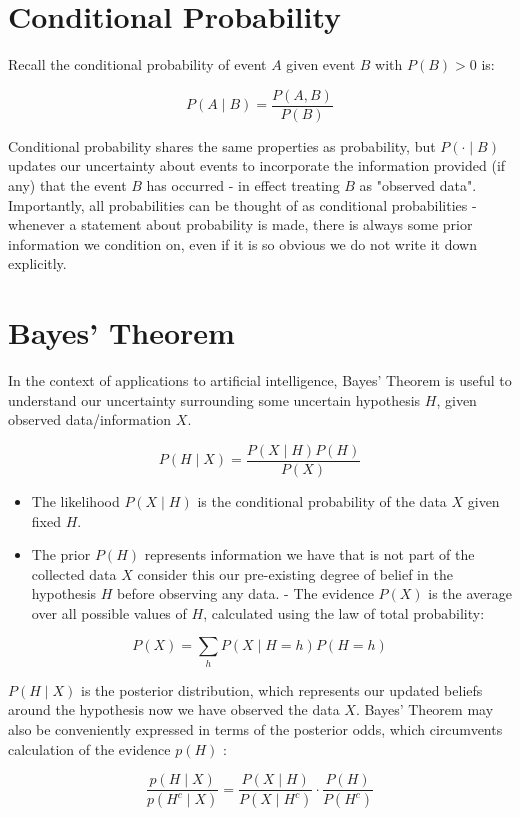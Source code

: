 \section{Conditional Probability}
Recall the conditional probability of event $A$ given event $B$ with $P(B)>0$ is:

$$
P(A \mid B)=\frac{P(A, B)}{P(B)}
$$

Conditional probability shares the same properties as probability, but $P(\cdot \mid B)$ updates our uncertainty about events to incorporate the information provided (if any) that the event $B$ has occurred - in effect treating $B$ as "observed data". Importantly, all probabilities can be thought of as conditional probabilities - whenever a statement about probability is made, there is always some prior information we condition on, even if it is so obvious we do not write it down explicitly.

\section{Bayes' Theorem}
In the context of applications to artificial intelligence, Bayes' Theorem is useful to understand our uncertainty surrounding some uncertain hypothesis $H$, given observed data/information $X$.

$$
P(H \mid X)=\frac{P(X \mid H) P(H)}{P(X)}
$$

\begin{itemize}
  \item The likelihood $P(X \mid H)$ is the conditional probability of the data $X$ given fixed $H$.

  \item The prior $P(H)$ represents information we have that is not part of the collected data $X$ consider this our pre-existing degree of belief in the hypothesis $H$ before observing any data. - The evidence $P(X)$ is the average over all possible values of $H$, calculated using the law of total probability:

\end{itemize}

$$
P(X)=\sum_{h} P(X \mid H=h) P(H=h)
$$

$P(H \mid X)$ is the posterior distribution, which represents our updated beliefs around the hypothesis now we have observed the data $X$. Bayes' Theorem may also be conveniently expressed in terms of the posterior odds, which circumvents calculation of the evidence $p(H)$ :

$$
\frac{p(H \mid X)}{p\left(H^{c} \mid X\right)}=\frac{P(X \mid H)}{P\left(X \mid H^{c}\right)} \cdot \frac{P(H)}{P\left(H^{c}\right)}
$$

